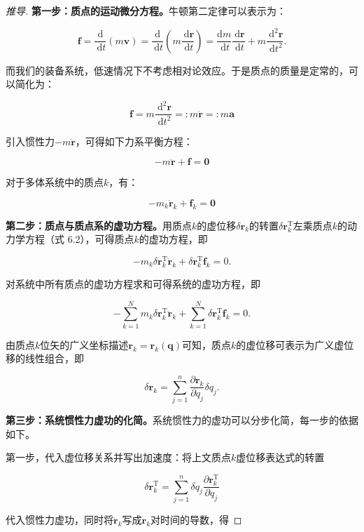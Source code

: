 \begin{proof}[推导]
\textbf{第一步：质点的运动微分方程。}牛顿第二定律可以表示为：

\[
\boldsymbol{f}=\frac{\mathrm{d}}{\mathrm{~d} t}(m \boldsymbol{v})=\frac{\mathrm{d}}{\mathrm{~d} t}\left(m \frac{\mathrm{~d} \boldsymbol{r}}{\mathrm{~d} t}\right)=\frac{\mathrm{d} m}{\mathrm{~d} t} \frac{\mathrm{~d} \boldsymbol{r}}{\mathrm{~d} t}+m \frac{\mathrm{~d}^{2} \boldsymbol{r}}{\mathrm{~d} t^{2}} .
\]

而我们的装备系统，低速情况下不考虑相对论效应。于是质点的质量是定常的，可以简化为：

\[
\boldsymbol{f}=m\frac{\mathrm{~d}^{2} \boldsymbol{r}}{\mathrm{~d} t^{2}}=:m\ddot{\boldsymbol{r}}=:m\mathbf{a}
\]

引入惯性力$-m\ddot{\boldsymbol{r}}$，可得如下力系平衡方程：

\[
-m\ddot{\boldsymbol{r}}+\boldsymbol{f}=\boldsymbol{0}
\]

对于多体系统中的质点$k$，有：

\[
-m_k\ddot{\boldsymbol{r}}_k+\boldsymbol{f}_k=\boldsymbol{0}
\]

\textbf{第二步：质点与质点系的虚功方程。}用质点$k$的虚位移$\delta\boldsymbol{r}_k$的转置$\delta\boldsymbol{r}_k^\mathrm{T}$左乘质点$k$的动力学方程（式 6.2），可得质点$k$的虚功方程，即

\[
-m_k\delta\boldsymbol{r}_k^\mathrm{T}\ddot{\boldsymbol{r}}_k+\delta\boldsymbol{r}_k^\mathrm{T}\boldsymbol{f}_k=0.
\]

对系统中所有质点的虚功方程求和可得系统的虚功方程，即

\[
-\sum_{k=1}^Nm_k\delta\boldsymbol{r}_k^\mathrm{T}\ddot{\boldsymbol{r}}_k+\sum_{k=1}^N\delta\boldsymbol{r}_k^\mathrm{T}\boldsymbol{f}_k=0.
\]

由质点$k$位矢的广义坐标描述$\boldsymbol{r}_k = \boldsymbol{r}_k(\boldsymbol{q})$可知，质点$k$的虚位移可表示为广义虚位移的线性组合，即

\[
\delta\boldsymbol{r}_k = \sum_{j=1}^{n}\frac{\partial \boldsymbol{r}_k}{\partial q_j}\delta q_j.
\]

\textbf{第三步：系统惯性力虚功的化简。}系统惯性力的虚功可以分步化简，每一步的依据如下。

第一步，代入虚位移关系并写出加速度：将上文质点$k$虚位移表达式的转置

\[
\delta\boldsymbol{r}_k^{\mathrm{T}} = \sum_{j=1}^{n} \delta q_j \frac{\partial \boldsymbol{r}_k^{\mathrm{T}}}{\partial q_j}
\]

代入惯性力虚功，同时将$\ddot{\boldsymbol{r}}_k$写成$\dot{\boldsymbol{r}}_k$对时间的导数，得


\end{proof}
